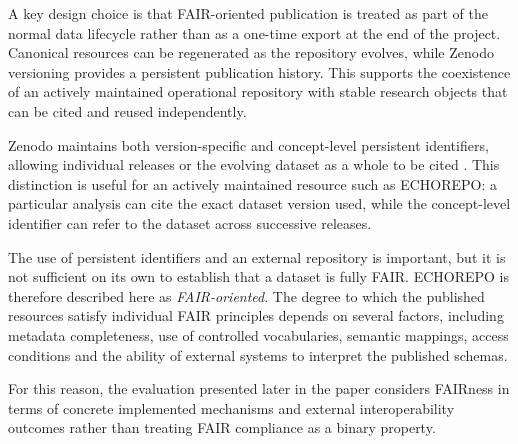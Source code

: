 A key design choice is that FAIR-oriented publication is treated as part of the
normal data lifecycle rather than as a one-time export at the end of the
project. Canonical resources can be regenerated as the repository evolves,
while Zenodo versioning provides a persistent publication history. This
supports the coexistence of an actively maintained operational repository with
stable research objects that can be cited and reused independently.

Zenodo maintains both version-specific and concept-level persistent
identifiers, allowing individual releases or the evolving dataset as a whole to
be cited \parencite{zenodo2026versioning}. This distinction is useful for an
actively maintained resource such as ECHOREPO: a particular analysis can cite
the exact dataset version used, while the concept-level identifier can refer to
the dataset across successive releases.

The use of persistent identifiers and an external repository is important, but
it is not sufficient on its own to establish that a dataset is fully FAIR.
ECHOREPO is therefore described here as \emph{FAIR-oriented}. The degree to
which the published resources satisfy individual FAIR principles depends on
several factors, including metadata completeness, use of controlled
vocabularies, semantic mappings, access conditions and the ability of external
systems to interpret the published schemas.

For this reason, the evaluation presented later in the paper considers
FAIRness in terms of concrete implemented mechanisms and external
interoperability outcomes rather than treating FAIR compliance as a binary
property.